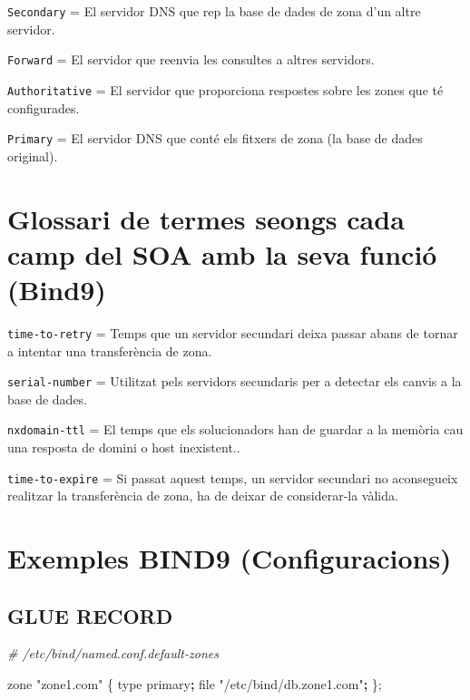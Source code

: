\documentclass[]{article}
\newenvironment{Shaded}{}{}
\newcommand{\BuiltInTok}[1]{#1}
\newcommand{\CommentTok}[1]{\textcolor[rgb]{0.38,0.63,0.69}{\textit{#1}}}
\newcommand{\ExtensionTok}[1]{#1}
\newcommand{\FunctionTok}[1]{\textcolor[rgb]{0.02,0.16,0.49}{#1}}
\newcommand{\KeywordTok}[1]{\textcolor[rgb]{0.00,0.44,0.13}{\textbf{#1}}}
\newcommand{\NormalTok}[1]{#1}
\newcommand{\StringTok}[1]{\textcolor[rgb]{0.25,0.44,0.63}{#1}}
\begin{document}
\texttt{Secondary} = El servidor DNS que rep la base de dades de zona
d'un altre servidor.

\texttt{Forward} = El servidor que reenvia les consultes a altres
servidors.

\texttt{Authoritative} = El servidor que proporciona respostes sobre les
zones que té configurades.

\texttt{Primary} = El servidor DNS que conté els fitxers de zona (la
base de dades original).

\hypertarget{glossari-de-termes-seongs-cada-camp-del-soa-amb-la-seva-funciuxf3-bind9}{%
\section{\texorpdfstring{\textbf{Glossari de termes seongs cada camp del
SOA amb la seva funció
(Bind9)}}{Glossari de termes seongs cada camp del SOA amb la seva funció (Bind9)}}\label{glossari-de-termes-seongs-cada-camp-del-soa-amb-la-seva-funciuxf3-bind9}}

\texttt{time-to-retry} = Temps que un servidor secundari deixa passar
abans de tornar a intentar una transferència de zona.

\texttt{serial-number} = Utilitzat pels servidors secundaris per a
detectar els canvis a la base de dades.

\texttt{nxdomain-ttl} = El temps que els solucionadors han de guardar a
la memòria cau una resposta de domini o host inexistent..

\texttt{time-to-expire} = Si passat aquest temps, un servidor secundari
no aconsegueix realitzar la transferència de zona, ha de deixar de
considerar-la vàlida.

\hypertarget{exemples-bind9-configuracions}{%
\section{\texorpdfstring{\textbf{Exemples BIND9
(Configuracions)}}{Exemples BIND9 (Configuracions)}}\label{exemples-bind9-configuracions}}

\hypertarget{glue-record}{%
\subsection{\texorpdfstring{\textbf{GLUE
RECORD}}{GLUE RECORD}}\label{glue-record}}

\begin{Shaded}
\begin{Highlighting}[]
\CommentTok{# /etc/bind/named.conf.default-zones}

\ExtensionTok{zone} \StringTok{"zone1.com"}\NormalTok{ \{}
    \BuiltInTok{type}\NormalTok{ primary}\KeywordTok{;}
    \FunctionTok{file} \StringTok{"/etc/bind/db.zone1.com"}\KeywordTok{;}
\NormalTok{\};}
\end{Highlighting}
\end{Shaded}
\end{document}
